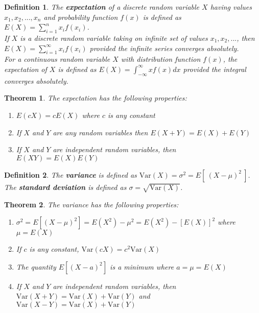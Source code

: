 \documentclass[14pt,twoside]{extreport}
\theoremstyle{dotless}
\newtheorem*{defn}{\footnotesize Definition}
\newtheorem*{thm}{\footnotesize Theorem} %
\begin{document}
\begin{defn}
    The \textbf{expectation} of a discrete random variable $X$ having values $x_1, x_2, ..., x_n$ and probability function $f(x)$ is defined as $E\left (X\right ) = \sum_{i=1}^n x_i f\left (x_i\right )$.
    \\

    If $X$ is a discrete random variable taking on infinite set of values $x_1, x_2, ...$, then $E(X) = \sum_{i=1}^\infty x_i f(x_i)$ provided the infinite series converges absolutely.
    \\

    For a continuous random variable $X$ with distribution function $f(x)$, the expectation of $X$ is defined as $E(X) = \int_{- \infty}^\infty x f(x) dx$ provided the integral converges absolutely.
\end{defn}


\begin{samepage}
\begin{thm}
    The expectation has the following properties:

    \begin{enumerate}
        \item $E(c X) = c E(X)$ where $c$ is any constant
        \item If $X$ and $Y$ are any random variables then $E(X + Y) = E(X) + E(Y)$
        \item If $X$ and $Y$ are independent random variables, then $E(XY) = E(X)E(Y)$
    \end{enumerate}
\end{thm}
\end{samepage}

\begin{defn}
    The \textbf{variance} is defined as $\text{Var} (X) = \sigma ^2 = E[ \  (X - \mu)^2 \  ]$.
    The \textbf{standard deviation} is defined as $\sigma = \sqrt{\text{Var} (X)}$.
\end{defn}

\begin{samepage}
\begin{thm}
    The variance has the following properties:

    \begin{enumerate}
        \item $\sigma ^2 = E\left [ \left (X - \mu \right ) ^2 \right ] = E\left (X ^2\right ) - \mu ^2 = E\left (X ^2\right ) - \left [E\left (X\right )\right ] ^2$ where $\mu = E\left (X\right )$
        \item If $c$ is any constant, $\text{Var}(cX) = c^2 \text{Var}(X)$
        \item The quantity $E[ (X - a)^2 ]$ is a minimum where $a = \mu = E(X)$
        \item If $X$ and $Y$ are independent random variables, then \\ $\text{Var}(X+Y) = \text{Var}(X) + \text{Var}(Y)$ and $\text{Var}(X-Y) = \text{Var}(X) + \text{Var}(Y)$
    \end{enumerate}
\end{thm}
\end{samepage}
\end{document}
